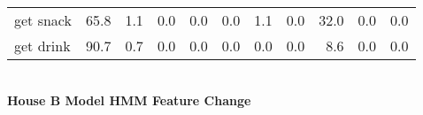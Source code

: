 \documentclass{article}
\begin{document}
\begin{sideways}
\begin{tabular}{lrrrrrrrrrr}
get snack         &        65.8 &                1.1 &               0.0 &                0.0 &                0.0 &              1.1 &                      0.0 &                  32.0 &              0.0 &              0.0 \\
get drink         &        90.7 &                0.7 &               0.0 &                0.0 &                0.0 &              0.0 &                      0.0 &                   8.6 &              0.0 &              0.0 \\
\bottomrule
\end{tabular}
\end{sideways}
\normalsize
\vspace{1cm}\\
\textbf{House B Model HMM Feature Change}\\
\vspace{1cm}\\
\end{document}
